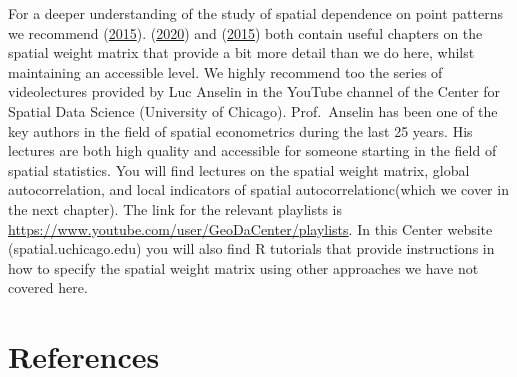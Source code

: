 \documentclass[
  krantz2]{krantz}
\begin{document}
For a deeper understanding of the study of spatial dependence on point patterns we recommend (\protect\hyperlink{ref-Baddeley_2016}{2015}). (\protect\hyperlink{ref-Haining_2020}{2020}) and (\protect\hyperlink{ref-Darmofal_2015}{2015}) both contain useful chapters on the spatial weight matrix that provide a bit more detail than we do here, whilst maintaining an accessible level. We highly recommend too the series of videolectures provided by Luc Anselin in the YouTube channel of the Center for Spatial Data Science (University of Chicago). Prof.~Anselin has been one of the key authors in the field of spatial econometrics during the last 25 years. His lectures are both high quality and accessible for someone starting in the field of spatial statistics. You will find lectures on the spatial weight matrix, global autocorrelation, and local indicators of spatial autocorrelationc(which we cover in the next chapter). The link for the relevant playlists is \url{https://www.youtube.com/user/GeoDaCenter/playlists}. In this Center website (spatial.uchicago.edu) you will also find R tutorials that provide instructions in how to specify the spatial weight matrix using other approaches we have not covered here.

\hypertarget{references}{%
\chapter*{References}\label{references}}
\end{document}
